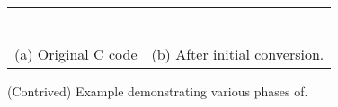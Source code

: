 {%
%

\begin{listing}[t!]
  \begin{tabular}{c c}
    \begin{minipage}[b]{.22\textwidth}
\inputminted[mathescape, escapeinside=||, fontsize=\tiny{}]{c}{examples/orig1.c}
    \end{minipage} &
    \begin{minipage}[b]{.22\textwidth}
\inputminted[mathescape, escapeinside=||, fontsize=\tiny{}]{c}{examples/orig2.c}
    \end{minipage} \\
   (a) Original C code & (b) After initial conversion.\\
  \end{tabular}
\caption{(Contrived) Example demonstrating various phases of.}
\label{lst:comb}
\end{listing}

}
